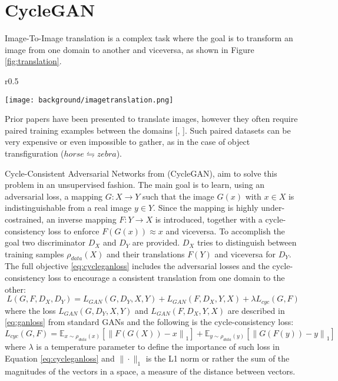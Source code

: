 \section{CycleGAN}
Image-To-Image translation is a complex task where the goal is to transform an image from one domain to another and viceversa, as shown in Figure \ref{fig:translation}.

\begin{wrapfigure}{r}{0.5\textwidth}
  \begin{center}
    \texttt{[image: background/imagetranslation.png]}
  \end{center}
  \caption{Image-to-image translation example \citep{CycleGAN2017}.}
  \label{fig:translation}
\end{wrapfigure}
Prior papers have been presented to translate images, however they often require paired training examples between the domains [\citet{https://doi.org/10.48550/arxiv.1612.00835}, \citet{karakan}].
Such paired datasets can be very expensive or even impossible to gather, as in the case of object transfiguration ($horse \leftrightharpoons zebra$).

Cycle-Consistent Adversarial Networks from \citet{CycleGAN2017} (CycleGAN), aim to solve this problem in an unsupervised fashion. The main goal is to learn, using an adversarial loss, a mapping $G:X\rightarrow Y$ such that the image $G(x) $ with $x\in X$ is indistinguishable from a real image $y\in Y$. Since the mapping is highly under-costrained, an inverse mapping $F:Y \rightarrow X$ is introduced, together with a cycle-consistency loss to enforce $F(G(x)) \approx x$ and viceversa.
To accomplish the goal two discriminator $D_{X}$ and $D_{Y}$ are provided. $D_{X}$ tries to distinguish between training samples $\rho_{data}(X)$ and their translations $F(Y)$ and viceversa for $D_{Y}$. 
The full objective \ref{eq:cycleganloss} includes the adversarial losses and the cycle-consistency loss to encourage a consistent translation from one domain to the other:
\begin{equation}
  \label{eq:cycleganloss}
  L(G,F,D_{X}, D_{Y}) = L_{GAN}(G, D_{Y},X,Y) + L_{GAN}(F, D_{X},Y,X) + \lambda L_{cyc}(G,F)
\end{equation}
where the loss $L_{GAN}(G, D_{Y},X,Y)$ and $L_{GAN}(F, D_{X},Y,X)$ are described in \ref{eq:ganloss} from standard GANs
and the following is the cycle-consistency loss:
\begin{equation}
  L_{cyc}(G,F) =  \mathbb{E}_{x\sim \rho_{data}(x)}[\left \| F(G(X))-x \right \|_1] + \mathbb{E}_{y\sim \rho_{data}(y)}[\left \| G(F(y))-y \right \|_1]
\end{equation}
where $\lambda$ is a temperature parameter to define the importance of such loss in Equation \ref{eq:cycleganloss} and $\| \cdot \|_1$ is the L1 norm or rather the sum of the magnitudes of the vectors in a space, a measure of the distance between vectors.

